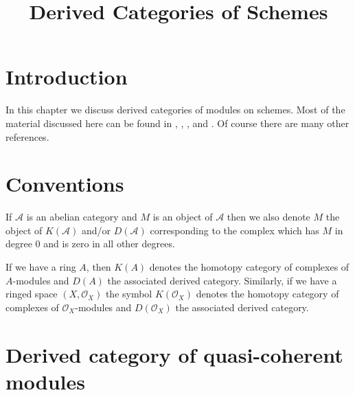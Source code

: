 

%


\title{Derived Categories of Schemes}


\maketitle

\label{section-phantom}

\tableofcontents

\section{Introduction}
\label{section-introduction}

\noindent
In this chapter we discuss derived categories of modules on schemes.
Most of the material discussed here can be found in
\cite{TT}, \cite{Bokstedt-Neeman}, \cite{BvdB}, and \cite{LN}.
Of course there are many other references.


\section{Conventions}
\label{section-conventions}

\noindent
If $\mathcal{A}$ is an abelian category and $M$ is an object
of $\mathcal{A}$ then we also denote $M$ the object of $K(\mathcal{A})$
and/or $D(\mathcal{A})$ corresponding to the complex which has
$M$ in degree $0$ and is zero in all other degrees.

\medskip\noindent
If we have a ring $A$, then $K(A)$ denotes the homotopy category
of complexes of $A$-modules and $D(A)$ the associated derived category.
Similarly, if we have a ringed space $(X, \mathcal{O}_X)$ the symbol
$K(\mathcal{O}_X)$ denotes the homotopy category of complexes of
$\mathcal{O}_X$-modules and $D(\mathcal{O}_X)$ the associated derived
category.










\section{Derived category of quasi-coherent modules}
\label{section-derived-quasi-coherent}

